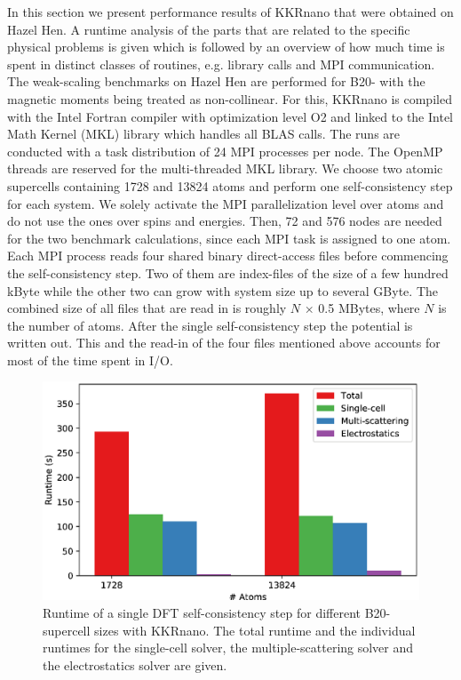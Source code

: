 \documentclass[graybox]{svmult}
\begin{document}
In this section we present performance results of KKRnano that were obtained on Hazel Hen.
A runtime analysis of the parts that are related to the specific physical problems is given
which is followed by an overview of how much time is spent in distinct
classes of routines, e.g. library calls and MPI communication.
The weak-scaling benchmarks on Hazel Hen are performed for B20- 
with the magnetic moments being treated as
non-collinear.
For this, KKRnano is compiled with the Intel Fortran compiler
with optimization level O2 and linked to the Intel Math Kernel (MKL) library which handles all BLAS calls.
The runs are conducted with a task distribution of 24 MPI processes per node. The OpenMP threads 
are reserved for the multi-threaded MKL library.
We choose two atomic supercells containing 1728 and 13824 atoms 
and perform one self-consistency step for each system.
We solely activate the MPI parallelization level over atoms and do not use the ones over spins and energies.
Then, 72 and 576  nodes
are needed for the two benchmark calculations, since each MPI task is assigned to one atom. 
Each MPI process reads four shared binary direct-access
files before commencing the self-consistency step.
Two of them are index-files of the size of a few hundred kByte while the other two can grow with system size
up to several GByte. The combined size of all files that are 
read in is roughly $N$ $\times$ 0.5 MBytes, where $N$ is the number of atoms. 
After the single self-consistency step 
the potential is written out. 
This and the read-in of the four files mentioned above accounts for most of the time spent in I/O.
\begin{figure}[htb]
\begin{center}
 \includegraphics[width=1.0\textwidth]{Figures/MnGe_benchmarks.eps}
\end{center}
	\caption{Runtime of a single DFT self-consistency step
	for different B20- supercell sizes with KKRnano. 
	The total runtime and the individual runtimes for the single-cell solver,
	the multiple-scattering solver and the electrostatics solver are given.
	}
\label{fig:MnGe_6x6x6_benchmark}
\end{figure}
\end{document}
